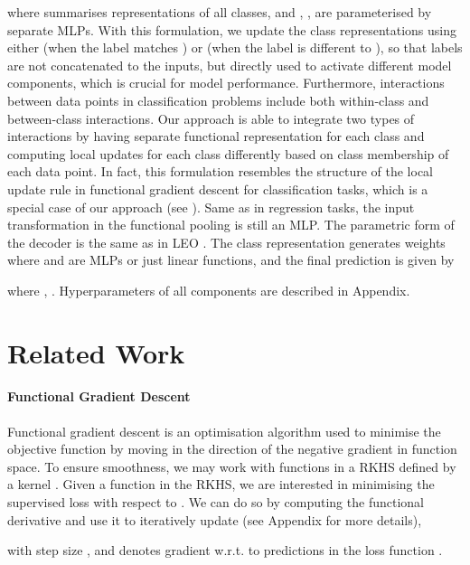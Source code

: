 \documentclass{article}
\theoremstyle{definition}
\begin{document}
where  summarises representations of all classes, and , ,  are parameterised by separate \gls{MLP}s.
With this formulation, we update the class representations using either  (when the label matches ) or  (when the label is different to ), so that labels are not concatenated to the inputs, but directly used to activate different model components, which is crucial for model performance. Furthermore, interactions between data points in classification problems include both within-class and between-class interactions. Our approach is able to integrate two types of interactions by having separate functional representation for each class and computing local updates for each class differently based on class membership of each data point.
In fact, this formulation resembles the structure of the local update rule in functional gradient descent for classification tasks, which is a special case of our approach (see ).
Same as in regression tasks, the input transformation  in the functional pooling is still an \gls{MLP}.
The parametric form of the decoder is the same as in \gls{LEO} \citep{rusu2018meta}.
The class representation  generates weights  where  and  are \gls{MLP}s or just linear functions,
and the final prediction is given by

where , .
Hyperparameters of all components are described in Appendix.


\section{Related Work} \label{sec:related_work}

\paragraph{Functional Gradient Descent} Functional gradient descent \citep{mason1999functional,guo2001norm} is an optimisation algorithm used to minimise the objective function by moving in the direction of the negative gradient in function space. 
To ensure smoothness, we may work with functions in a \gls{RKHS} \citep{aronszajn1950theory,berlinet2011reproducing} defined by a kernel .
Given a function  in the \gls{RKHS}, we are interested in minimising the supervised loss  with respect to . We can do so by computing the functional derivative and use it to iteratively update  (see Appendix for more details),

with step size , and  denotes gradient w.r.t. to predictions in the loss function .
\end{document}
